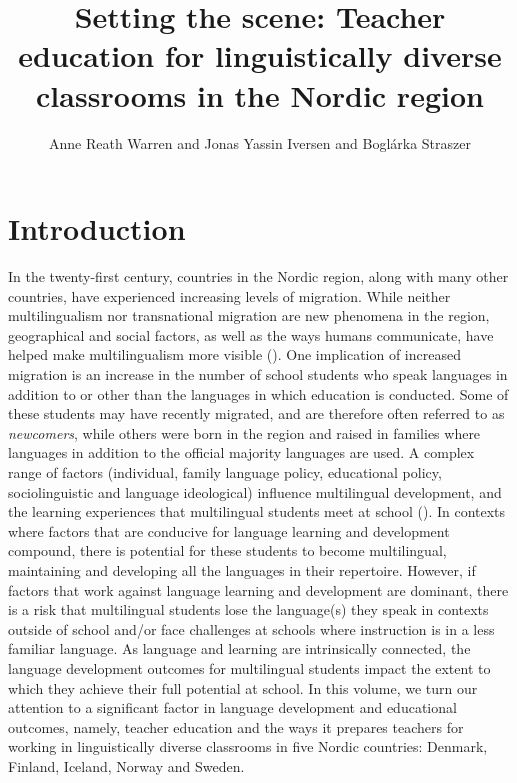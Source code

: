 \documentclass[output=paper]{langscibook}
\author{Anne Reath Warren\orcid{}\affiliation{Uppsala University} and Jonas Yassin Iversen\orcid{}\affiliation{Inland Norway University of Applied Sciences} and Boglárka Straszer\orcid{}\affiliation{University of Dalarna}}
\title[Setting the scene]{Setting the scene: Teacher education for linguistically diverse classrooms in the Nordic region}
\begin{document}
\maketitle 

\section{{Introduction}}\label{sec:reath:1}

In the twenty-first century, countries in the Nordic region, along with many other countries, have experienced increasing levels of migration. While neither multilingualism nor transnational migration are new phenomena in the region, geographical and social factors, as well as the ways humans communicate, have helped make multilingualism more visible (\citealt{AroninSingleton2008}). One implication of increased migration is an increase in the number of school students who speak languages in addition to or other than the languages in which education is conducted. Some of these students may have recently migrated, and are therefore often referred to as \textit{newcomers}, while others were born in the region and raised in families where languages in addition to the official majority languages are used. A complex range of factors (individual, family language policy, educational policy, sociolinguistic and language ideological) {i}nfluence multilingual development, and the learning experiences that multilingual students meet at school (\citealt{HornbergerSkilton-Sylvester2000,The_douglas_fir_group2016}). In contexts where factors that are conducive for language learning and development compound, there is potential for these students to become multilingual, maintaining and developing all the languages in their repertoire. However, if factors that work against language learning and development are dominant, there is a risk that multilingual students lose the language(s) they speak in contexts outside of school and/or face challenges at schools where instruction is in a less familiar language. As language and learning are intrinsically connected, the language development outcomes for multilingual students impact the extent to which they achieve their full potential at school. In this volume, we turn our attention to a significant factor in language development and educational outcomes, namely, teacher education and the ways it prepares teachers for working in linguistically diverse classrooms in five Nordic countries: Denmark, Finland, Iceland, Norway and Sweden.
\end{document}
